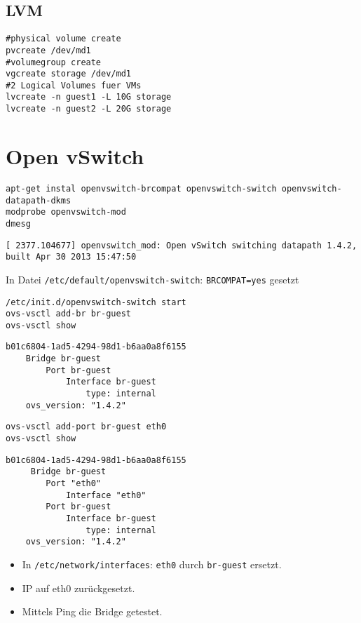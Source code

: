 \section{LVM}
\begin{verbatim}
#physical volume create
pvcreate /dev/md1 
#volumegroup create 
vgcreate storage /dev/md1
#2 Logical Volumes fuer VMs
lvcreate -n guest1 -L 10G storage
lvcreate -n guest2 -L 20G storage
\end{verbatim} 

\chapter{Open vSwitch}
\label{chap:ovs}
\begin{verbatim}
apt-get instal openvswitch-brcompat openvswitch-switch openvswitch-datapath-dkms
modprobe openvswitch-mod
dmesg
\end{verbatim} 
\setupVerbatimOut
\begin{verbatim}
[ 2377.104677] openvswitch_mod: Open vSwitch switching datapath 1.4.2, built Apr 30 2013 15:47:50
\end{verbatim}
In Datei \verb#/etc/default/openvswitch-switch#: \verb#BRCOMPAT=yes# gesetzt
\setupVerbatimBash
\begin{verbatim}
/etc/init.d/openvswitch-switch start
ovs-vsctl add-br br-guest
ovs-vsctl show
\end{verbatim}
\setupVerbatimOut
\begin{verbatim}
b01c6804-1ad5-4294-98d1-b6aa0a8f6155
    Bridge br-guest
        Port br-guest
            Interface br-guest
                type: internal
    ovs_version: "1.4.2"
\end{verbatim} 
\setupVerbatimBash
\begin{verbatim}
ovs-vsctl add-port br-guest eth0
ovs-vsctl show
\end{verbatim}
\setupVerbatimOut
\begin{verbatim}
b01c6804-1ad5-4294-98d1-b6aa0a8f6155
     Bridge br-guest
        Port "eth0"
            Interface "eth0"
        Port br-guest
            Interface br-guest
                type: internal
    ovs_version: "1.4.2"
\end{verbatim}
\begin{itemize}
\item In \verb#/etc/network/interfaces#: \verb#eth0# durch \verb#br-guest# ersetzt. 
\item IP auf eth0 zurückgesetzt. 
\item Mittels Ping die Bridge getestet.
\end{itemize}

